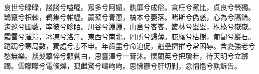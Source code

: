 
\begin{pinyinscope}
哀世兮睩睩，諓諓兮嗌喔。眾多兮阿媚，骫靡兮成俗。貪枉兮黨比，貞良兮煢獨。鵠竄兮枳棘，鵜集兮帷幄。蘮蕠兮青蔥，槁本兮萎落。睹斯兮偽惑，心為兮隔錯。逡巡兮圃藪，率彼兮畛陌。川谷兮淵淵，山峊兮峉峉。叢林兮崟崟，株榛兮嶽嶽。霜雪兮漼溰，冰凍兮洛澤。東西兮南北，罔所兮歸薄。庇廕兮枯樹，匍匐兮巖石。踡跼兮寒局數，獨處兮志不申。年齒盡兮命迫促，魁壘擠摧兮常困辱。含憂強老兮愁無樂。鬚髮薴悴兮顠鬢白，思靈澤兮一膏沐。懷蘭英兮把瓊若，待天明兮立躑躅。雲矇矇兮電鯈爍，孤雌驚兮鳴呴呴。思怫鬱兮肝切剝，忿悁悒兮孰訴告。


\end{pinyinscope}